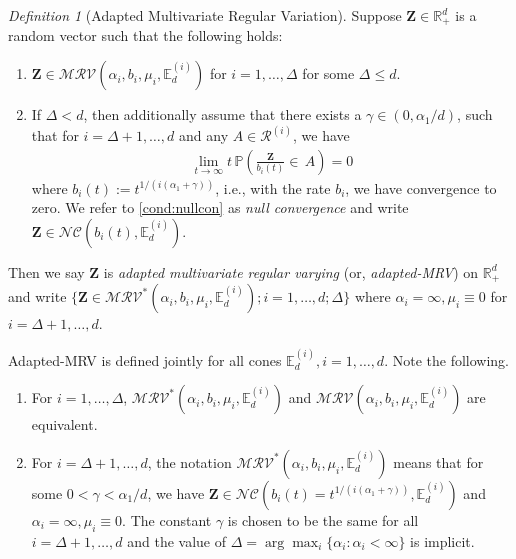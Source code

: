 \documentclass[aos]{imsart}
\numberwithin{equation}{section}
\theoremstyle{plain} %
\theoremstyle{remark}
\newtheorem{definition}[theorem]{Definition}
\newcommand{\E}{\mathbb{E}}
\renewcommand\P{\mathbb{P}}
\newcommand{\R}{\mathbb{R}}
\def\MRV{\mathcal{MRV}}
\def\cR{\mathcal{R}}
\def\bZ{\boldsymbol Z}
\begin{document}
\begin{definition}[Adapted Multivariate Regular Variation]\label{def:amrv}
Suppose $\bZ\in \R_+^d$ is a random vector such that the following holds:
\begin{enumerate}
    \item $\bZ \in \MRV(\alpha_i,b_i,\mu_i,\E_d^{(i)})$  for $i=1,\ldots, \Delta$ for some $\Delta \le d$.
    \item If $\Delta<d$, then additionally assume that there exists a $\gamma\in (0,\alpha_1/d)$, such that for \linebreak $i=\Delta+1,\ldots, d$ and any $A\in \cR^{(i)}$, we have
\begin{align}\label{cond:nullcon}
 \lim_{t\to\infty} t\,\P\left(\frac{\bZ}{b_i(t)}\in \, A\right)  =0
\end{align}
    where $b_i(t):=t^{1/(i(\alpha_1+\gamma))}$, i.e., with the rate $b_i$, we have convergence to zero. We refer to \eqref{cond:nullcon} as \emph{null convergence} and write $\bZ\in \mathcal{NC}(b_i(t),\E_d^{(i)})$.
\end{enumerate}
Then we say $\bZ$ is \emph{adapted multivariate regular varying} (or, \emph{adapted-MRV}) on $\R^d_{+}$ and write
$\{\bZ\in \MRV^*(\alpha_i,b_i,\mu_i,\E_d^{(i)}); i=1,\ldots, d; \Delta\}$ where $\alpha_i=\infty, \mu_i\equiv 0$ for $i=\Delta+1, \ldots, d$.
\end{definition}
Adapted-MRV is defined jointly for all cones $\E_d^{(i)}, i=1,\ldots, d$. Note the following.
\begin{enumerate}
\item[i)] For $i=1,\ldots, \Delta$, $\MRV^*(\alpha_i,b_i,\mu_i,\E_d^{(i)})$ and $\MRV(\alpha_i,b_i,\mu_i,\E_d^{(i)})$ are equivalent.
\item[ii)] For  $i=\Delta+1,\ldots,d$, the notation $\MRV^*(\alpha_i,b_i,\mu_i,\E_d^{(i)})$ means that for some \linebreak $0<\gamma<\alpha_1/d$, we have  $\bZ\in \mathcal{NC}(b_i(t)=t^{1/(i(\alpha_1+\gamma))}, \E_d^{(i)})$ and $\alpha_i=\infty, \mu_i\equiv 0$. The constant $\gamma$ is chosen to be the same for all $i=\Delta+1,\ldots,d$ and the value of  $\Delta=\arg \max_i \{\alpha_i: \alpha_i<\infty\}$ is implicit.
\end{enumerate}
\end{document}
